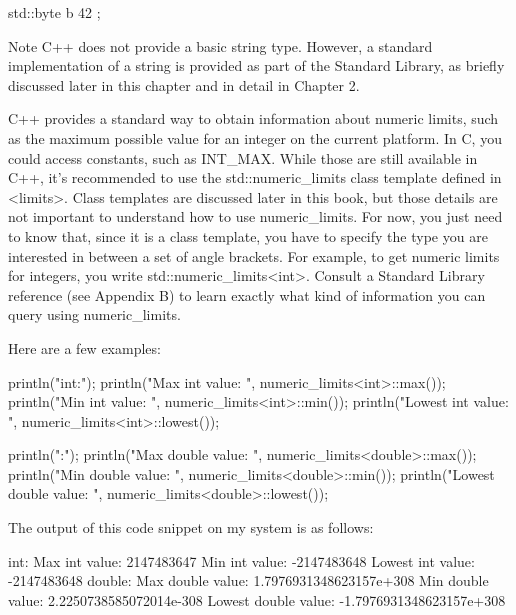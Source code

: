 \begin{cpp}
std::byte b { 42 };
\end{cpp}

\begin{myNotic}{Note}
C++ does not provide a basic string type. However, a standard implementation of a string is provided as part of the Standard Library, as briefly discussed later in this chapter and in detail in Chapter 2.
\end{myNotic}


C++ provides a standard way to obtain information about numeric limits, such as the maximum possible value for an integer on the current platform. In C, you could access constants, such as INT\_MAX. While those are still available in C++, it’s recommended to use the std::numeric\_limits class template defined in <limits>. Class templates are discussed later in this book, but those details are not important to understand how to use numeric\_limits. For now, you just need to know that, since it is a class template, you have to specify the type you are interested in between a set of angle brackets. For example, to get numeric limits for integers, you write std::numeric\_limits<int>. Consult a Standard Library reference (see Appendix B) to learn exactly what kind of information you can query using numeric\_limits.

Here are a few examples:

\begin{cpp}
println("int:");
println("Max int value: {}", numeric_limits<int>::max());
println("Min int value: {}", numeric_limits<int>::min());
println("Lowest int value: {}", numeric_limits<int>::lowest());

println("\ndouble:");
println("Max double value: {}", numeric_limits<double>::max());
println("Min double value: {}", numeric_limits<double>::min());
println("Lowest double value: {}", numeric_limits<double>::lowest());
\end{cpp}

The output of this code snippet on my system is as follows:

\begin{shell}
int:
Max int value: 2147483647
Min int value: -2147483648
Lowest int value: -2147483648
double:
Max double value: 1.7976931348623157e+308
Min double value: 2.2250738585072014e-308
Lowest double value: -1.7976931348623157e+308
\end{shell}

